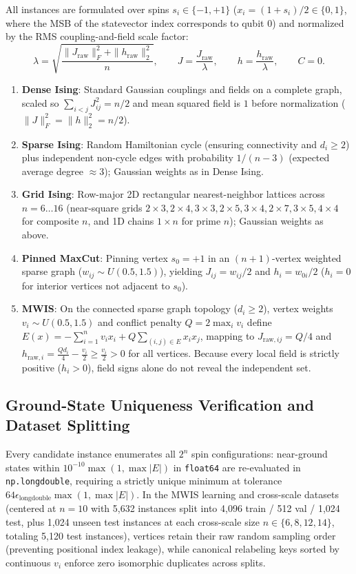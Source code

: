 \documentclass{article}
\theoremstyle{plain}
\theoremstyle{definition}
\begin{document}
All instances are formulated over spins $s_i\in\{-1,+1\}$ ($x_i=(1+s_i)/2\in\{0,1\}$, where the MSB of the statevector index corresponds to qubit $0$) and normalized by the RMS coupling-and-field scale factor:
\[
\lambda=\sqrt{\frac{\|J_{\mathrm{raw}}\|_F^2+\|h_{\mathrm{raw}}\|_2^2}{n}},
\qquad J=\frac{J_{\mathrm{raw}}}{\lambda},\qquad h=\frac{h_{\mathrm{raw}}}{\lambda},\qquad C=0.
\]
\begin{enumerate}\setlength{\itemsep}{0pt}\setlength{\parskip}{1pt}\setlength{\topsep}{1pt}
\item \textbf{Dense Ising}: Standard Gaussian couplings and fields on a complete graph, scaled so $\sum_{i<j}J_{ij}^2=n/2$ and mean squared field is $1$ before normalization ($\|J\|_F^2=\|h\|_2^2=n/2$).
\item \textbf{Sparse Ising}: Random Hamiltonian cycle (ensuring connectivity and $d_i\ge 2$) plus independent non-cycle edges with probability $1/(n-3)$ (expected average degree $\approx 3$); Gaussian weights as in Dense Ising.
\item \textbf{Grid Ising}: Row-major 2D rectangular nearest-neighbor lattices across $n=6\ldots 16$ (near-square grids $2\times 3, 2\times 4, 3\times 3, 2\times 5, 3\times 4, 2\times 7, 3\times 5, 4\times 4$ for composite $n$, and 1D chains $1\times n$ for prime $n$); Gaussian weights as above.
\item \textbf{Pinned MaxCut}: Pinning vertex $s_0=+1$ in an $(n+1)$-vertex weighted sparse graph ($w_{ij}\sim U(0.5, 1.5)$), yielding $J_{ij}=w_{ij}/2$ and $h_i=w_{0i}/2$ ($h_i=0$ for interior vertices not adjacent to $s_0$).
\item \textbf{MWIS}: On the connected sparse graph topology ($d_i\ge 2$), vertex weights $v_i\sim U(0.5, 1.5)$ and conflict penalty $Q=2\max_i v_i$ define $E(x)=-\sum_{i=1}^n v_ix_i+Q\sum_{(i,j)\in E}x_ix_j$, mapping to $J_{\mathrm{raw},ij}=Q/4$ and $h_{\mathrm{raw},i}=\frac{Qd_i}{4}-\frac{v_i}{2}\ge\frac{v_i}{2}>0$ for all vertices. Because every local field is strictly positive ($h_i>0$), field signs alone do not reveal the independent set.

\end{enumerate}
\subsection{Ground-State Uniqueness Verification and Dataset Splitting}\label{subsec:c_2}

Every candidate instance enumerates all $2^n$ spin configurations: near-ground states within $10^{-10}\max(1,\max|E|)$ in \texttt{float64} are re-evaluated in \texttt{np.longdouble}, requiring a strictly unique minimum at tolerance $64\epsilon_{\mathrm{longdouble}}\max(1,\max|E|)$. In the MWIS learning and cross-scale datasets (centered at $n=10$ with 5,632 instances split into 4,096 train / 512 val / 1,024 test, plus 1,024 unseen test instances at each cross-scale size $n\in\{6,8,12,14\}$, totaling 5,120 test instances), vertices retain their raw random sampling order (preventing positional index leakage), while canonical relabeling keys sorted by continuous $v_i$ enforce zero isomorphic duplicates across splits.
\end{document}
